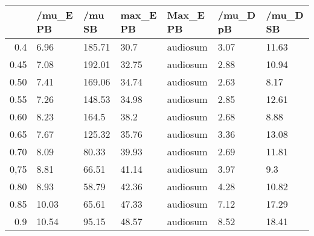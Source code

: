 \begin{table}[ht]
\centering
\begin{tabular}{rllllll}
  \hline
 & /mu\_E PB & /mu SB & max\_E PB & Max\_E PB & /mu\_D pB & /mu\_D SB \\ 
  \hline
0.4 & 6.96 & 185.71 & 30.7 & audiosum & 3.07 & 11.63 \\ 
  0.45 & 7.08 & 192.01 & 32.75 & audiosum & 2.88 & 10.94 \\ 
  0.50 & 7.41 & 169.06 & 34.74 & audiosum & 2.63 & 8.17 \\ 
  0.55 & 7.26 & 148.53 & 34.98 & audiosum & 2.85 & 12.61 \\ 
  0.60 & 8.23 & 164.5 & 38.2 & audiosum & 2.68 & 8.88 \\ 
  0.65 & 7.67 & 125.32 & 35.76 & audiosum & 3.36 & 13.08 \\ 
  0.70 & 8.09 & 80.33 & 39.93 & audiosum & 2.69 & 11.81 \\ 
  0,75 & 8.81 & 66.51 & 41.14 & audiosum & 3.97 & 9.3 \\ 
  0.80 & 8.93 & 58.79 & 42.36 & audiosum & 4.28 & 10.82 \\ 
  0.85 & 10.03 & 65.61 & 47.33 & audiosum & 7.12 & 17.29 \\ 
  0.9 & 10.54 & 95.15 & 48.57 & audiosum & 8.52 & 18.41 \\ 
   \hline
\end{tabular}
\end{table}

